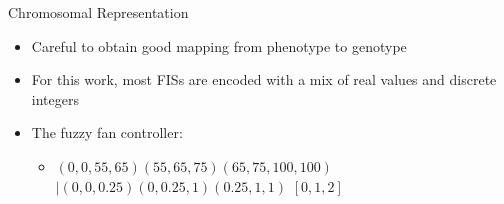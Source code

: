 \documentclass[]{beamer}
\begin{document}
\begin{frame}{Chromosomal Representation}
    \begin{itemize}
        \item Careful to obtain good mapping from phenotype to genotype 
        \item For this work, most FISs are encoded with a mix of real values and discrete integers
        \item The fuzzy fan controller:
            \begin{itemize}
                \item \begin{math}
                        \left(0, 0, 55, 65\right) \left(55, 65, 75\right) \left(65, 75, 100, 100\right)
                    \end{math}
                    \begin{math}
                        |\left(0, 0, 0.25\right) \left(0, 0.25, 1\right) \left(0.25, 1, 1\right)
                    \end{math}
                    \begin{math}
                        \left[0, 1, 2\right]
                    \end{math}
            \end{itemize}
    \end{itemize}
\end{frame}



\end{document}
